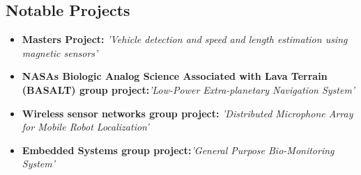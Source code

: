 \documentclass[11pt,a4paper,sans]{moderncv}        %
\begin{document}
\vspace{2pt}

\subsection{Notable Projects}


\begin{itemize}

\item{\textbf{Masters Project:} \textit{'Vehicle detection and speed and length estimation using magnetic sensors'}}




\item{\textbf{NASAs Biologic Analog Science Associated with Lava Terrain (BASALT) group project:}\textit{'Low-Power Extra-planetary Navigation System'}}




\item{\textbf{Wireless sensor networks group project:} \textit{'Distributed Microphone Array for Mobile Robot Localization'}}




\item{\textbf{Embedded Systems group project:}\textit{'General Purpose Bio-Monitoring System'}}



\end{itemize}
\end{document}
